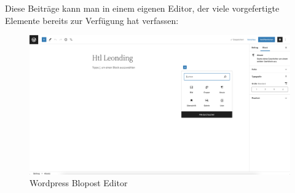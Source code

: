 Diese Beiträge kann man in einem eigenen Editor, der viele vorgefertigte Elemente bereits zur Verfügung hat verfassen:

\begin{figure}[hbt!]
    \centering
    \includegraphics[scale=0.2]{pics/blogpost}
    \caption{Wordpress Blopost Editor}
    \label{fig:impl:blogpost}
\end{figure}
